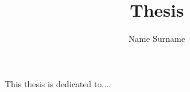 \documentclass[a4,12pt,twoside,openright,italian,english]{book}%
\author{Name Surname}
\title{Thesis}
\begin{document}

\maketitle

\pagestyle{empty}

\cleardoublepage
\newpage

\thispagestyle{empty}
    \null{}
        \begin{flushright}
                This thesis is dedicated to....
        \end{flushright}
\null

\cleardoublepage
\newpage

\pagestyle{empty}


\cleardoublepage
\newpage

\pagestyle{empty}
\setcounter{page}{1}


\end{document}
